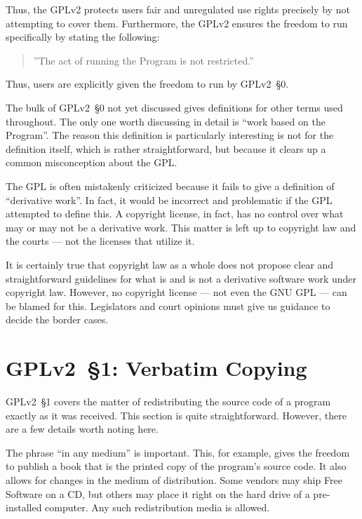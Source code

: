 \medskip

Thus, the GPLv2 protects users fair and unregulated use rights precisely by
not attempting to cover them.  Furthermore, the GPLv2 ensures the freedom
to run specifically by stating the following:
\begin{quote}
''The act of running the Program is not restricted.''
\end{quote}
Thus, users are explicitly given the freedom to run by GPLv2~\S0.

\medskip

The bulk of GPLv2~\S0 not yet discussed gives definitions for other terms used
throughout.  The only one worth discussing in detail is ``work based on
the Program''.  The reason this definition is particularly interesting is
not for the definition itself, which is rather straightforward, but
because it clears up a common misconception about the GPL\@.

The GPL is often mistakenly criticized because it fails to give a
definition of ``derivative work''.  In fact, it would be incorrect and
problematic if the GPL attempted to define this.  A copyright license, in
fact, has no control over what may or may not be a derivative work.  This
matter is left up to copyright law and the courts --- not the licenses that utilize it.

It is certainly true that copyright law as a whole does not propose clear
and straightforward guidelines for what is and is not a derivative
software work under copyright law.  However, no copyright license --- not
even the GNU GPL --- can be blamed for this.  Legislators and court
opinions must give us guidance to decide the border cases.

\section{GPLv2~\S1: Verbatim Copying}
\label{GPLv2s1}

GPLv2~\S1 covers the matter of redistributing the source code of a program
exactly as it was received. This section is quite straightforward.
However, there are a few details worth noting here.

The phrase ``in any medium'' is important.  This, for example, gives the
freedom to publish a book that is the printed copy of the program's source
code.  It also allows for changes in the medium of distribution.  Some
vendors may ship Free Software on a CD, but others may place it right on
the hard drive of a pre-installed computer.  Any such redistribution media
is allowed.

